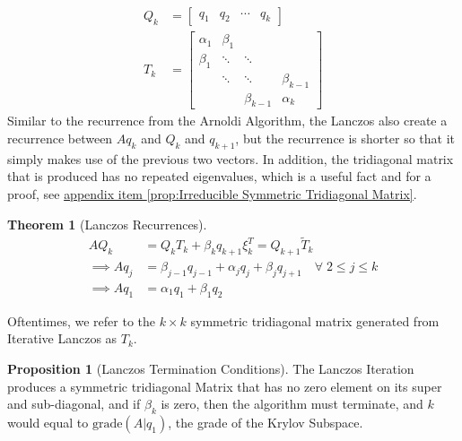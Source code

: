 \documentclass[]{article}
\theoremstyle{definition}
\newtheorem{theorem}{Theorem}            %
\newtheorem{prop}{Proposition}[section]  %
\begin{document}
            \begin{align}
                Q_k &= \begin{bmatrix}
                    q_1 & q_2 & \cdots & q_k
                \end{bmatrix}
                \\
                T_k &= 
                \begin{bmatrix}
                    \alpha_1 & \beta_1 & & 
                    \\[0.8em]
                    \beta_1 & \ddots & \ddots & 
                    \\[0.8em]
                    &\ddots &\ddots & \beta_{k - 1}
                    \\[0.8em]
                    & & \beta_{k - 1} & \alpha_k
                \end{bmatrix}
            \end{align}
            Similar to the recurrence from the Arnoldi Algorithm, the Lanczos also create a recurrence between $Aq_k$ and $Q_k$ and $q_{k + 1}$, but the recurrence is shorter so that it simply makes use of the previous two vectors. In addition, the tridiagonal matrix that is produced has no repeated eigenvalues, which is a useful fact and for a proof, see \hyperref[prop:Irreducible Symmetric Tridiagonal Matrix]{appendix item \ref*{prop:Irreducible Symmetric Tridiagonal Matrix}}. 
            \begin{theorem}[Lanczos Recurrences]
                \begin{align}
                    AQ_k &= Q_kT_k + \beta_k q_{k + 1}\xi_k^T = Q_{k + 1}\tilde{T}_k
                    \\
                    \implies Aq_j
                    &= \beta_{j - 1}q_{j - 1} + \alpha_j q_j + \beta_{j}q_{j + 1} \quad \forall\; 2\le j\le k
                    \\
                    \implies Aq_1 &= \alpha_1q_1 + \beta_1 q_2
                \end{align}    
            \end{theorem}
            \par
            Oftentimes, we refer to the $k\times k$ symmetric tridiagonal matrix generated from Iterative Lanczos as $T_k$. 
            \begin{prop}[Lanczos Termination Conditions]\label{prop:Lanczos_Termination_Conditions}
                The Lanczos Iteration produces a symmetric tridiagonal Matrix that has no zero element on its super and sub-diagonal, and if $\beta_k$ is zero, then the algorithm must terminate, and $k$ would equal to $\text{grade}(A|q_1)$, the grade of the Krylov Subspace. 
            \end{prop}
\end{document}
